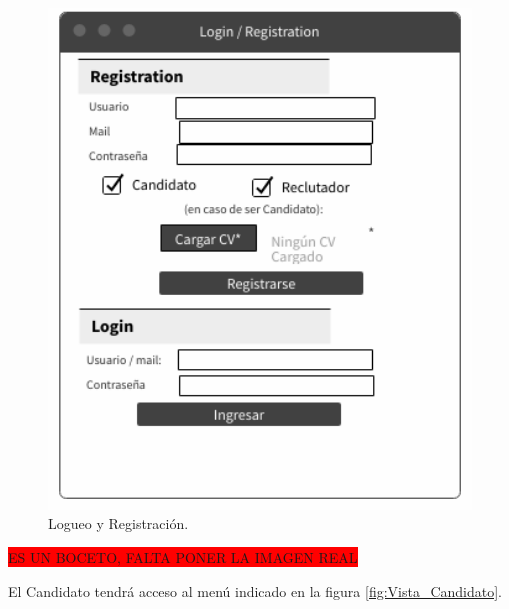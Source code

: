 \documentclass[12pt,a4paper]{article}
\begin{document}
\begin{sloppypar}
\begin{figure}[H]    %
  \centering
  \includegraphics[width=1\textwidth]{images/Vista_Registro.png}
  \caption{Logueo y Registración.}  
  \label{fig:Vista_Registro}
\end{figure}

\colorbox{red}{ES UN BOCETO, FALTA PONER LA IMAGEN REAL}

El Candidato tendrá acceso al menú indicado en la figura \ref{fig:Vista_Candidato}. 


\end{sloppypar}
\end{document}

